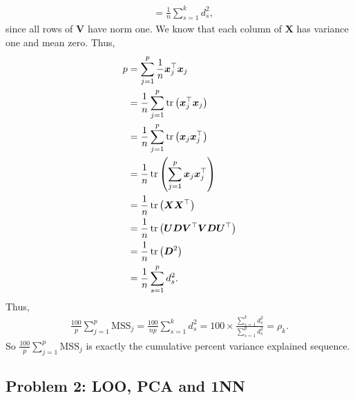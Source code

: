 \begin{enumerate}[label=(\alph*)]
\begin{align*}
        &=\frac{1}{n}\sum_{s=1}^k d_s^2,
    \end{align*}
    since all rows of $\bm{V}$ have norm one. We know that each column of $\bm{X}$ has variance one and mean zero. Thus,
    \begin{align*}
        p&=\sum_{j=1}^p \frac{1}{n} \bm{x}_j^\top \bm{x}_j\\
        &=\frac{1}{n}\sum_{j=1}^p \operatorname{tr}\left(\bm{x}_j^\top \bm{x}_j\right)\\
        &=\frac{1}{n}\sum_{j=1}^p \operatorname{tr}\left(\bm{x}_j\bm{x}_j^\top \right)\\
        &=\frac{1}{n}\operatorname{tr}\left(\sum_{j=1}^p \bm{x}_j\bm{x}_j^\top \right)\\
        &=\frac{1}{n}\operatorname{tr}\left(\bm{X}\bm{X}^\top\right)\\
        &=\frac{1}{n}\operatorname{tr}\left(\bm{U}\bm{D}\bm{V}^\top \bm{V}\bm{D}\bm{U}^\top\right)\\
        &=\frac{1}{n}\operatorname{tr}\left(\bm{D}^2\right)\\
        &=\frac{1}{n}\sum_{s=1}^p d_s^2.
    \end{align*}
    Thus,
    \begin{align*}
        \frac{100}{p}\sum_{j=1}^p \mathrm{MSS}_j =\frac{100}{np} \sum_{s=1}^k d_s^2=100 \times \frac{\sum_{s=1}^k d_s^2}{\sum_{s=1}^p d_s^2} =\rho_k.
    \end{align*}
    So $\frac{100}{p}\sum_{j=1}^p \mathrm{MSS}_j$ is exactly the cumulative percent variance explained sequence.
\end{enumerate}

\subsection*{Problem 2: LOO, PCA and 1NN}

